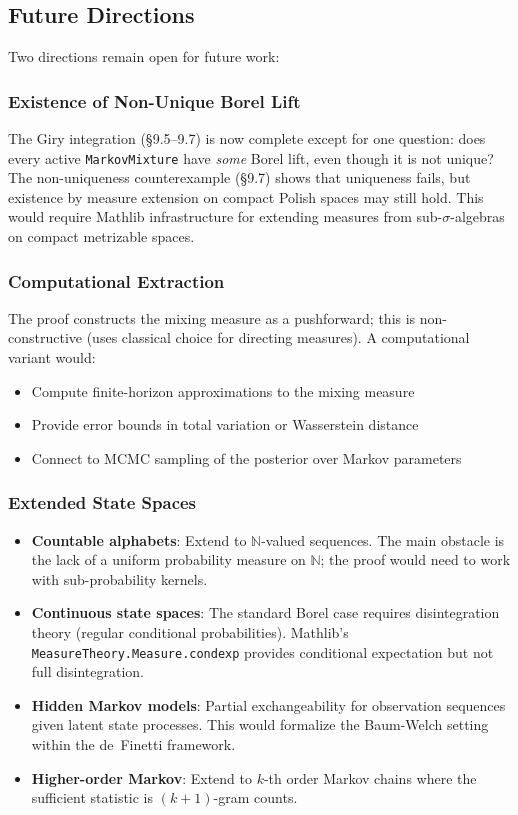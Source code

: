 \documentclass[11pt,a4paper]{article}
\theoremstyle{definition}
\begin{document}
\subsection{Future Directions}

Two directions remain open for future work:

\subsubsection{Existence of Non-Unique Borel Lift}

The Giry integration (\S9.5--9.7) is now complete except for one question:
does every active \texttt{MarkovMixture} have \emph{some} Borel lift, even
though it is not unique? The non-uniqueness counterexample (\S9.7) shows that
uniqueness fails, but existence by measure extension on compact Polish spaces
may still hold. This would require Mathlib infrastructure for extending measures
from sub-$\sigma$-algebras on compact metrizable spaces.

\subsubsection{Computational Extraction}

The proof constructs the mixing measure as a pushforward; this is
non-constructive (uses classical choice for directing measures).
A computational variant would:
\begin{itemize}
\item Compute finite-horizon approximations to the mixing measure
\item Provide error bounds in total variation or Wasserstein distance
\item Connect to MCMC sampling of the posterior over Markov parameters
\end{itemize}

\subsubsection{Extended State Spaces}

\begin{itemize}
\item \textbf{Countable alphabets}: Extend to $\mathbb{N}$-valued sequences.
  The main obstacle is the lack of a uniform probability measure on $\mathbb{N}$;
  the proof would need to work with sub-probability kernels.
\item \textbf{Continuous state spaces}: The standard Borel case requires
  disintegration theory (regular conditional probabilities). Mathlib's
  \texttt{MeasureTheory.Measure.condexp} provides conditional expectation
  but not full disintegration.
\item \textbf{Hidden Markov models}: Partial exchangeability for observation
  sequences given latent state processes. This would formalize the Baum-Welch
  setting within the de~Finetti framework.
\item \textbf{Higher-order Markov}: Extend to $k$-th order Markov chains
  where the sufficient statistic is $(k+1)$-gram counts.
\end{itemize}
\end{document}
